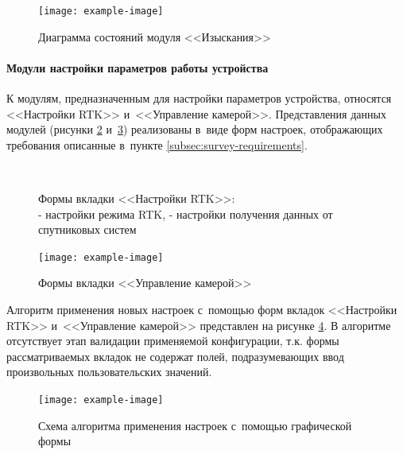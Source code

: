 \begin{figure}[h!]
  \centering
  \setlength{\fboxsep}{5pt}
  \texttt{[image: example-image]}
  \vspace*{6pt}
  \caption{Диаграмма состояний модуля <<Изыскания>>}
  \label{fig:survey-uml-state}
\end{figure}

\paragraph{Модули настройки параметров работы устройства}
\label{subsec:device-settings}

К модулям, предназначенным для настройки параметров устройства, относятся <<Настройки RTK>> и~<<Управление камерой>>. Представления данных модулей (рисунки \ref{fig:rtk-settings} и~\ref{fig:camera-control}) реализованы в~виде форм настроек, отображающих требования описанные в~пункте \ref{subsec:survey-requirements}.

\begin{figure}[h!]
  \centering
  \setlength{\fboxsep}{5pt}
  \\
  \vspace*{6pt}
  \caption{
    Формы вкладки <<Настройки RTK>>:\\
    \protect{} - настройки режима RTK,
    \protect{} - настройки получения данных от спутниковых систем
  }
  \label{fig:rtk-settings}
\end{figure}

\begin{figure}[h!]
  \centering
  \setlength{\fboxsep}{5pt}
  \texttt{[image: example-image]}
  \vspace*{6pt}
  \caption{Формы вкладки <<Управление камерой>>}
  \label{fig:camera-control}
\end{figure}

Алгоритм применения новых настроек с~помощью форм вкладок <<Настройки RTK>> и~<<Управление камерой>> представлен на рисунке \ref{fig:basic-form-apply}. В алгоритме отсутствует этап валидации применяемой конфигурации, т.к. формы рассматриваемых вкладок не содержат полей, подразумевающих ввод произвольных пользовательских значений.

\begin{figure}[h!]
  \centering
  \setlength{\fboxsep}{5pt}
  \texttt{[image: example-image]}
  \vspace*{6pt}
  \caption{Схема алгоритма применения настроек с~помощью графической формы}
  \label{fig:basic-form-apply}
\end{figure}

